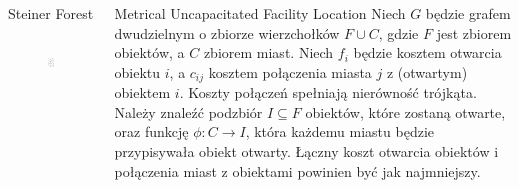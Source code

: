 \documentclass[final,hyperref={pdfpagelabels=false}]{beamer}
\begin{document}
\begin{frame}
\begin{columns}
\begin{column}{.46\textwidth}
\begin{block}{Steiner Forest}
\begin{minipage}{\linewidth}
\begin{columns}
            \begin{column}{.38\linewidth}
              \begin{figure}
                \centering
                \includegraphics[height=.96\linewidth]{sf_poster}
              \end{figure}
            \end{column}

          \end{columns}
        \end{minipage}
      \end{block}

    \end{column}

    \begin{column}{.46\textwidth}
      \begin{block}{Metrical Uncapacitated Facility Location}
                Niech $G$ będzie grafem dwudzielnym o zbiorze wierzchołków $F \cup C$, gdzie $F$ jest zbiorem obiektów, a $C$ zbiorem miast. Niech $f_i$ będzie kosztem
                otwarcia obiektu $i$, a $c_{ij}$ kosztem połączenia miasta $j$ z (otwartym) obiektem $i$. Koszty połączeń spełniają nierówność trójkąta. Należy znaleźć
                podzbiór $I \subseteq F$ obiektów, które zostaną otwarte, oraz funkcję $\phi : C \rightarrow I$, która każdemu miastu będzie przypisywała obiekt
                otwarty. Łączny koszt otwarcia obiektów i połączenia miast z obiektami powinien być jak najmniejszy.


\end{block}
\end{column}
\end{columns}
\end{frame}
\end{document}
